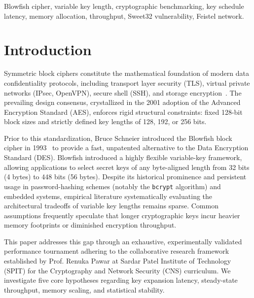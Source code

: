 \documentclass[conference]{IEEEtran}
\begin{document}
\begin{IEEEkeywords}
Blowfish cipher, variable key length, cryptographic benchmarking, key schedule latency, memory allocation, throughput, Sweet32 vulnerability, Feistel network.
\end{IEEEkeywords}

\section{Introduction}
Symmetric block ciphers constitute the mathematical foundation of modern data confidentiality protocols, including transport layer security (TLS), virtual private networks (IPsec, OpenVPN), secure shell (SSH), and storage encryption~\cite{ferguson2010cryptography}. The prevailing design consensus, crystallized in the 2001 adoption of the Advanced Encryption Standard (AES), enforces rigid structural constraints: fixed 128-bit block sizes and strictly defined key lengths of 128, 192, or 256 bits. 

Prior to this standardization, Bruce Schneier introduced the Blowfish block cipher in 1993~\cite{schneier1993blowfish} to provide a fast, unpatented alternative to the Data Encryption Standard (DES). Blowfish introduced a highly flexible variable-key framework, allowing applications to select secret keys of any byte-aligned length from 32 bits (4 bytes) to 448 bits (56 bytes). Despite its historical prominence and persistent usage in password-hashing schemes (notably the \texttt{bcrypt} algorithm) and embedded systems, empirical literature systematically evaluating the architectural tradeoffs of variable key lengths remains sparse. Common assumptions frequently speculate that longer cryptographic keys incur heavier memory footprints or diminished encryption throughput.

This paper addresses this gap through an exhaustive, experimentally validated performance tournament adhering to the collaborative research framework established by Prof. Renuka Pawar at Sardar Patel Institute of Technology (SPIT) for the Cryptography and Network Security (CNS) curriculum. We investigate five core hypotheses regarding key expansion latency, steady-state throughput, memory scaling, and statistical stability.
\end{document}
